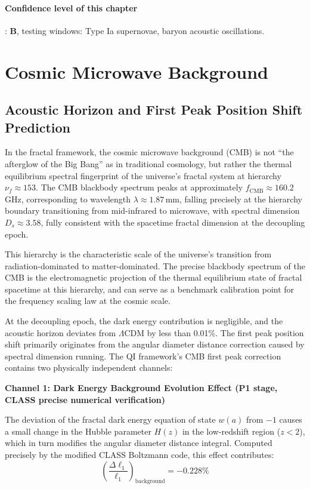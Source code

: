 \documentclass[12pt,a4paper,twocolumn]{article}
\begin{document}
\paragraph{Confidence level of this chapter}: \textbf{B}, testing windows: Type Ia supernovae, baryon acoustic oscillations.

\section{Cosmic Microwave Background}
\label{sec:cmb}

\subsection{Acoustic Horizon and First Peak Position Shift Prediction}
\label{subsec:cmb_peak}

In the fractal framework, the cosmic microwave background (CMB) is not ``the afterglow of the Big Bang'' as in traditional cosmology, but rather the thermal equilibrium spectral fingerprint of the universe's fractal system at hierarchy $\nu_f \approx 153$. The CMB blackbody spectrum peaks at approximately $f_{\text{CMB}} \approx 160.2$\,GHz, corresponding to wavelength $\lambda \approx 1.87$\,mm, falling precisely at the hierarchy boundary transitioning from mid-infrared to microwave, with spectral dimension $D_s \approx 3.58$, fully consistent with the spacetime fractal dimension at the decoupling epoch.

This hierarchy is the characteristic scale of the universe's transition from radiation-dominated to matter-dominated. The precise blackbody spectrum of the CMB is the electromagnetic projection of the thermal equilibrium state of fractal spacetime at this hierarchy, and can serve as a benchmark calibration point for the frequency scaling law at the cosmic scale.

At the decoupling epoch, the dark energy contribution is negligible, and the acoustic horizon deviates from $\Lambda$CDM by less than 0.01\%. The first peak position shift primarily originates from the angular diameter distance correction caused by spectral dimension running. The QI framework's CMB first peak correction contains two physically independent channels:

\textbf{Channel 1: Dark Energy Background Evolution Effect (P1 stage, CLASS precise numerical verification)}

The deviation of the fractal dark energy equation of state $w(a)$ from $-1$ causes a small change in the Hubble parameter $H(z)$ in the low-redshift region ($z<2$), which in turn modifies the angular diameter distance integral. Computed precisely by the modified CLASS Boltzmann code, this effect contributes:
\[
\left(\frac{\Delta\ell_1}{\ell_1}\right)_{\text{background}} = -0.228\%
\]
\end{document}
